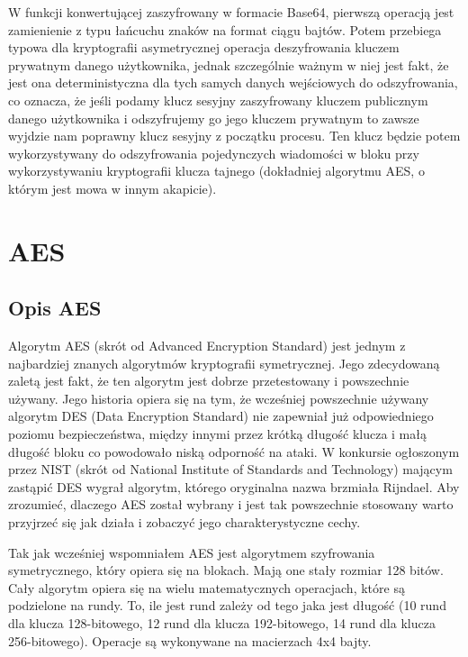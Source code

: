 W funkcji konwertującej zaszyfrowany w formacie Base64, pierwszą operacją jest zamienienie z typu łańcuchu znaków na format ciągu bajtów. Potem przebiega typowa dla kryptografii asymetrycznej operacja deszyfrowania kluczem prywatnym danego użytkownika, jednak szczególnie ważnym w niej jest fakt, że jest ona deterministyczna dla tych samych danych wejściowych do odszyfrowania, co oznacza, że jeśli podamy klucz sesyjny zaszyfrowany kluczem publicznym danego użytkownika i odszyfrujemy go jego kluczem prywatnym to zawsze wyjdzie nam poprawny klucz sesyjny z początku procesu. Ten klucz będzie potem wykorzystywany do odszyfrowania pojedynczych wiadomości w bloku przy wykorzystywaniu kryptografii klucza tajnego (dokładniej algorytmu AES, o którym jest mowa w innym akapicie).
\section{AES}
\subsection{Opis AES}
Algorytm AES (skrót od Advanced Encryption Standard) jest jednym z najbardziej znanych algorytmów kryptografii symetrycznej. Jego zdecydowaną zaletą jest fakt, że ten algorytm jest dobrze przetestowany i powszechnie używany. Jego historia opiera się na tym, że wcześniej powszechnie używany algorytm DES (Data Encryption Standard) nie zapewniał już odpowiedniego poziomu bezpieczeństwa, między innymi przez krótką długość klucza i małą długość bloku co powodowało niską odporność na ataki. W konkursie ogłoszonym przez NIST (skrót od National Institute of Standards and Technology) mającym zastąpić DES wygrał algorytm, którego oryginalna nazwa brzmiała Rijndael. Aby zrozumieć, dlaczego AES został wybrany i jest tak powszechnie stosowany warto przyjrzeć się jak działa i zobaczyć jego charakterystyczne cechy.

\vspace{1em}

Tak jak wcześniej wspomniałem AES jest algorytmem szyfrowania symetrycznego, który opiera się na blokach. Mają one stały rozmiar 128 bitów. Cały algorytm opiera się na wielu matematycznych operacjach, które są podzielone na rundy. To, ile jest rund zależy od tego jaka jest długość (10 rund dla klucza 128-bitowego, 12 rund dla klucza 192-bitowego, 14 rund dla klucza 256-bitowego). Operacje są wykonywane na macierzach 4x4 bajty.

\vspace{1em}

